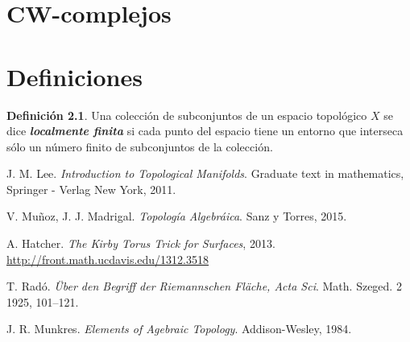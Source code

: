 \documentclass[10pt]{report}
\newcommand{\enfatiza}[1]{\textbf{\textit{#1}}}
\theoremstyle{definition}
\newtheorem{defin}{Definición}[section]
\begin{document}
\chapter{CW-complejos}

\chapter{Definiciones}

\begin{defin}%
Una colección de subconjuntos de un espacio topológico $X$ se dice \enfatiza{localmente finita} si cada punto del espacio tiene un entorno que interseca sólo un número finito de subconjuntos de la colección.
\end{defin}
\begin{thebibliography}{9}

J. M. Lee.
\textit{Introduction to Topological Manifolds}. Graduate text in mathematics, Springer - Verlag New York, 2011.

V. Muñoz, J. J. Madrigal. 
\textit{Topología Algebráica}. Sanz y Torres, 2015.


A. Hatcher.
\textit{The Kirby Torus Trick for Surfaces}, 2013.
\\\url{http://front.math.ucdavis.edu/1312.3518}


T. Radó.
\textit{Über den Begriff der Riemannschen Fläche, Acta Sci}. Math. Szeged. 2 1925,
101–121.

J. R. Munkres.
\textit{Elements of Agebraic Topology}. Addison-Wesley, 1984.


\end{thebibliography}
\end{document}
